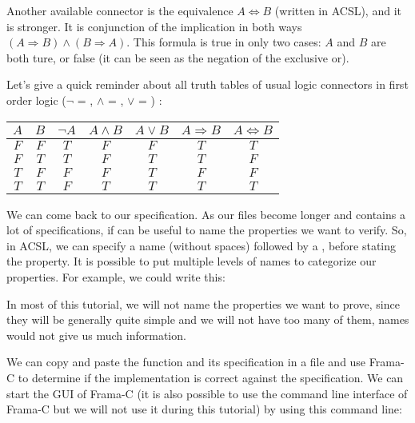 Another available connector is the equivalence $A \Leftrightarrow B$
(written  in ACSL), and it is
stronger. It is conjunction of the implication in both ways
$(A \Rightarrow B) \wedge (B \Rightarrow A)$. This formula is true in
only two cases: $A$ and $B$ are both ture, or false (it can be seen
as the negation of the exclusive or).



\begin{Information}
  Let's give a quick reminder about all
  truth tables of usual logic connectors in first order logic
  ($\neg$ = \CodeInline{!}, $\wedge$ = \CodeInline{\&\&}, $\vee$ = \CodeInline{||}) :

\begin{longtabu}{|c|c|c|c|c|c|c|} \hline
$A$ & $B$ & $\neg A$ & $A \wedge B$ & $A \vee B$ & $A \Rightarrow B$ & $A \Leftrightarrow B$ \\ \hline
$F$ & $F$ & $T$ & $F$ & $F$ & $T$ & $T$ \\ \hline
$F$ & $T$ & $T$ & $F$ & $T$ & $T$ & $F$ \\ \hline
$T$ & $F$ & $F$ & $F$ & $T$ & $F$ & $F$ \\ \hline
$T$ & $T$ & $F$ & $T$ & $T$ & $T$ & $T$ \\ \hline
\end{longtabu}
\end{Information}


We can come back to our specification. As our files become longer and
contains a lot of specifications, if can be useful to name the
properties we want to verify. So, in ACSL, we can specify a name
(without spaces) followed by a \CodeInline{:}, before stating the property.
It is possible to put multiple levels of names to categorize our
properties. For example, we could write this:






In most of this tutorial, we will not name the properties we want to
prove, since they will be generally quite simple and we will not have
too many of them, names would not give us much information.

We can copy and paste the function  and its specification in
a file  and use Frama-C to determine if the implementation
is correct against the specification. We can start the GUI of Frama-C
(it is also possible to use the command line interface of Frama-C but we
will not use it during this tutorial) by using this command line:



